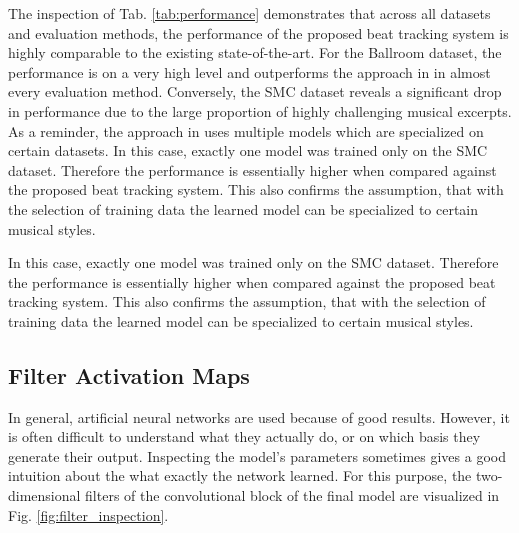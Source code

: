 \documentclass{scrartcl}
\begin{document}
The inspection of Tab. \ref{tab:performance} demonstrates that across all datasets and evaluation methods, the performance of the proposed beat tracking system is highly comparable to the existing state-of-the-art. For the Ballroom dataset, the performance is on a very high level and outperforms the approach in \cite{Boeck2014} in almost every evaluation method. Conversely, the SMC dataset reveals a significant drop in performance due to the large proportion of highly challenging musical excerpts. As a reminder, the approach in \cite{Boeck2014} uses multiple models which are specialized on certain datasets. In this case, exactly one model was trained only on the SMC dataset. Therefore the performance is essentially higher when compared against the proposed beat tracking system. This also confirms the assumption, that with the selection of training data the learned model can be specialized to certain musical styles.

In this case, exactly one model was trained only on the SMC dataset. Therefore the performance is essentially higher when compared against the proposed beat tracking system. This also confirms the assumption, that with the selection of training data the learned model can be specialized to certain musical styles.

\subsection{Filter Activation Maps}
In general, artificial neural networks are used because of good results. However, it is often difficult to understand what they actually do, or on which basis they generate their output. Inspecting the model's parameters sometimes gives a good intuition about the what exactly the network learned. For this purpose, the two-dimensional filters of the convolutional block of the final model are visualized in Fig. \ref{fig:filter_inspection}.
\end{document}

